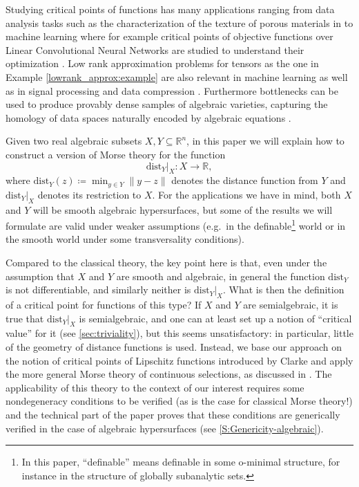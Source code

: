 \documentclass{amsart}
\newcommand{\R}{\mathbb{R}}
\newcommand{\dd}{\mathrm{dist}}
\newcommand{\dist}{{\mathrm{dist}_Y|_X}}
\theoremstyle{definition}
\theoremstyle{remark}
\begin{document}
Studying critical points of functions has many applications ranging from data analysis tasks such as the characterization of the texture of porous materials in \cite{song2023generalized} to machine learning where for example critical points of objective functions over Linear Convolutional Neural Networks are studied to understand their optimization \cite{Kohn_22, Kohn_24}. Low rank approximation problems for tensors as the one in Example \ref{lowrank_approx:example} are also relevant in machine learning as well as in signal processing and data compression \cite{Bader_tensors,MAL-059}. Furthermore bottlenecks can be used to produce provably dense samples of algebraic varieties, capturing the homology of data spaces naturally encoded by algebraic equations \cite{Sampling_bottlenecks}.



Given two real algebraic subsets $X, Y \subseteq \R^n$, in this paper we will explain how to construct a version of Morse theory for the function
\[
\dist \colon X \to \R,
\]
where $\dd_Y(z) \coloneqq \min_{y\in Y} \| y - z \|$ denotes the distance function from $Y$ and $\dist$ denotes its restriction to $X$. For the applications we have in mind, both $X$ and $Y$ will be smooth algebraic hypersurfaces, but some of the results we will formulate are valid under weaker assumptions (e.g.\ in the definable\footnote{In this paper, ``definable'' means definable in some o-minimal structure, for instance in the structure of globally subanalytic sets.} world or in the smooth world under some transversality conditions).
 
 
Compared to the classical theory, the key point here is that, even under the assumption that $X$ and $Y$ are smooth and algebraic, in general the function $\dd_Y$ is not differentiable, and similarly neither is $\dist$. What is then the definition of a critical point for functions of this type? If $X$ and $Y$ are semialgebraic, it is true that $\dist$ is semialgebraic, and  one can at least set up a notion of ``critical value'' for it (see \cref{sec:triviality}), but this seems unsatisfactory: in particular, little of the geometry of distance functions is used.  Instead, we base our approach on the notion of critical points of Lipschitz functions introduced by Clarke \cite{Clarke} and apply the more general Morse theory of continuous selections, as discussed in  \cite{APS1997}. The applicability of this theory to the context of our interest requires some nondegeneracy conditions to be verified (as is the case for classical Morse theory!) and the technical part of the paper proves that these conditions are generically verified in the case of algebraic hypersurfaces (see \cref{S:Genericity-algebraic}).
\end{document}
